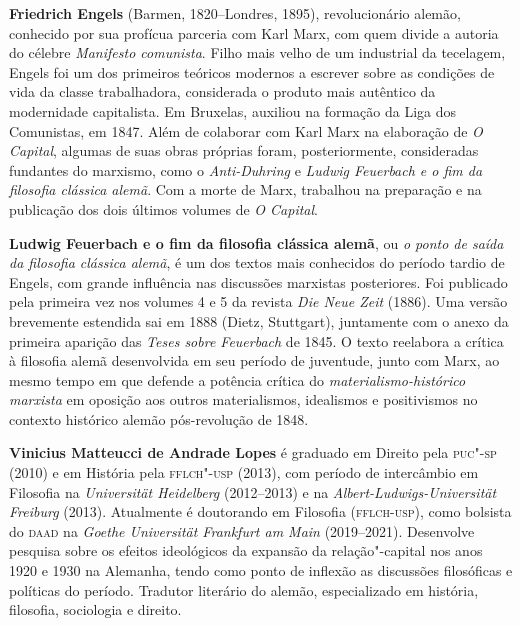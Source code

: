 \textbf{Friedrich Engels} (Barmen, 1820--Londres, 1895), revolucionário
alemão, conhecido por sua profícua parceria com Karl Marx, com quem
divide a autoria do célebre \emph{Manifesto comunista}. Filho mais velho
de um industrial da tecelagem, Engels foi um dos primeiros teóricos
modernos a escrever sobre as condições de vida da classe trabalhadora,
considerada o produto mais autêntico da modernidade capitalista. Em
Bruxelas, auxiliou na formação da Liga dos Comunistas, em 1847. Além de
colaborar com Karl Marx na elaboração de \emph{O Capital}, algumas de
suas obras próprias foram, posteriormente, consideradas fundantes do
marxismo, como o \emph{Anti-Duhring} e \emph{Ludwig Feuerbach e o fim da
filosofia clássica alemã}. Com a morte de Marx, trabalhou na preparação
e na publicação dos dois últimos volumes de \emph{O Capital}.

\textbf{Ludwig Feuerbach e o fim da filosofia clássica alemã}, ou
\emph{o ponto de saída da filosofia clássica alemã}, é um dos textos
mais conhecidos do período tardio de Engels, com grande influência nas
discussões marxistas posteriores. Foi publicado pela primeira vez nos
volumes 4 e 5 da revista \emph{Die Neue Zeit} (1886). Uma versão
brevemente estendida sai em 1888 (Dietz, Stuttgart), juntamente com o
anexo da primeira aparição das \emph{Teses sobre Feuerbach} de 1845. O
texto reelabora a crítica à filosofia alemã desenvolvida em seu período
de juventude, junto com Marx, ao mesmo tempo em que defende a potência
crítica do \emph{materialismo-histórico marxista} em oposição aos outros
materialismos, idealismos e positivismos no contexto histórico alemão
pós-revolução de 1848.
        
\textbf{Vinicius Matteucci de Andrade Lopes} é graduado em Direito pela
\textsc{puc"-sp} (2010) e em História pela \textsc{fflch"-usp} (2013),
com período de intercâmbio em Filosofia na \emph{Universität Heidelberg}
(2012--2013) e na \emph{Albert-Ludwigs-Universität Freiburg} (2013).
Atualmente é doutorando em Filosofia (\textsc{fflch-usp}), como bolsista
do \textsc{daad} na \emph{Goethe Universität Frankfurt am Main}
(2019--2021). Desenvolve pesquisa sobre os efeitos ideológicos da
expansão da relação"-capital nos anos 1920 e 1930 na Alemanha, tendo
como ponto de inflexão as discussões filosóficas e políticas do período.
Tradutor literário do alemão, especializado em história, filosofia,
sociologia e direito.


